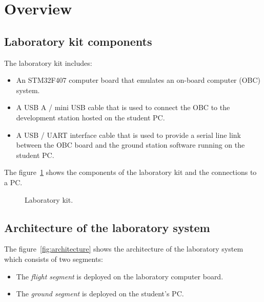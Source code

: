 \chapter*{Overview}\label{ch:overview}

\section*{Laboratory kit components}

The laboratory kit includes:
\begin{itemize}
\item	An STM32F407 computer board that emulates an on-board computer (OBC) system.

\item	A USB A / mini USB cable that is used to connect the OBC to the development station hosted on the student PC.

\item	A USB / UART interface cable that is used to provide a serial line link between the OBC board and the ground station software running on the student PC.
\end{itemize}

The figure~\ref{fig:kit} shows the components of the laboratory kit and the connections to a PC.

\begin{figure}[h]
            \caption{Laboratory kit.}
            \label{fig:kit}
\end{figure}

\section*{Architecture of the laboratory system}

The figure~\ref{fig:architecture} shows the architecture of the laboratory system which consists of two segments:
\begin{itemize}
\item The \textit{flight segment} is deployed on the laboratory computer board.
\item The \textit{ground segment} is deployed on the student's PC.
\end{itemize}

